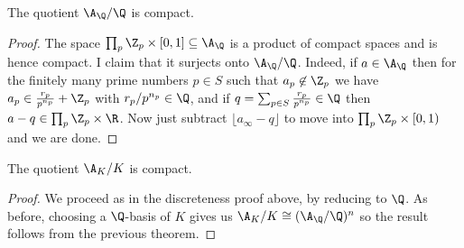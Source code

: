 \begin{theorem}
  \label{Rat.AdeleRing.cocompact}
  \leanok
  The quotient $\A_{\Q}/\Q$ is compact.
\end{theorem}
\begin{proof}
  The space $\prod_p\Z_p\times[0,1]\subseteq\A_{\Q}$ is a product of compact spaces
  and is hence compact. I claim that it surjects onto $\A_{\Q}/\Q$. Indeed,
  if $a\in\A_{\Q}$ then for the finitely many prime numbers $p\in S$ such that $a_p\not\in\Z_p$
  we have $a_p\in\frac{r_p}{p^{n_p}}+\Z_p$ with $r_p/p^{n_p}\in\Q$, and
  if $q=\sum_{p\in S}\frac{r_p}{p^{n_p}}\in\Q$ then $a-q\in \prod_p\Z_p\times\R$.
  Now just subtract $\lfloor a_{\infty}-q\rfloor$ to move into $\prod_p\Z_p\times[0,1)$
  and we are done.
\end{proof}

\begin{theorem}
  \label{NumberField.AdeleRing.cocompact}
  \leanok
  The quotient $\A_K/K$ is compact.
\end{theorem}
\begin{proof}
  We proceed as in the discreteness proof above, by reducing to $\Q$. As before, choosing
  a $\Q$-basis of $K$ gives us $\A_K/K\cong(\A_{\Q}/\Q)^n$ so the result follows from
  the previous theorem.
\end{proof}
